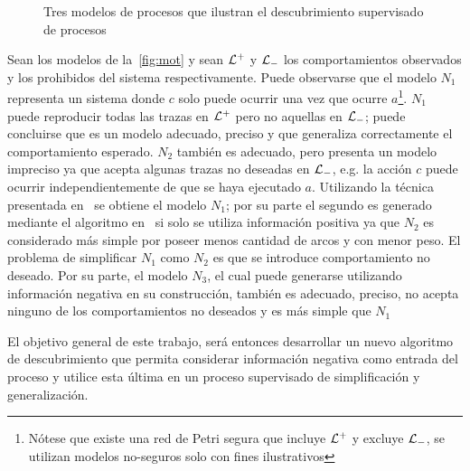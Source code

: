 \begin{example}
    \begin{figure}[H]
        \centering
        \hspace{10mm}
        \hspace{10mm}
        \hspace{10mm}
        \subbottom[\label{sfig:mot.4}]{\scalebox{.9}{}}
        \caption{Tres modelos de procesos que ilustran el descubrimiento supervisado de procesos}
        \label{fig:mot}
    \end{figure}

    Sean los modelos de la~\autoref{fig:mot} y sean ${\mathcal L}^+$ y ${\mathcal L}_-$ los 
    comportamientos observados y los prohibidos del sistema respectivamente.
    Puede observarse que el modelo $N_1$ representa un sistema donde $c$ solo puede ocurrir una vez
    que ocurre $a$\footnote{Nótese que existe una red de Petri segura que incluye ${\mathcal L}^+$ y 
    excluye ${\mathcal L}_-$, se utilizan modelos no-seguros solo con fines ilustrativos}.
    $N_1$ puede reproducir todas las trazas en ${\mathcal L}^+$ pero no aquellas en ${\mathcal L}_-$; puede
    concluirse que es un modelo adecuado, preciso y que generaliza correctamente el comportamiento
    esperado. $N_2$ también es adecuado, pero presenta un modelo impreciso ya que acepta 
    algunas trazas no deseadas en ${\mathcal L}_-$, e.g. la acción $c$ puede ocurrir independientemente de que 
    se haya ejecutado $a$. Utilizando la técnica presentada en~\cite{CarmonaC14} se obtiene el 
    modelo $N_1$; por su parte  el segundo es generado mediante el algoritmo en~\cite{LeonCB15} si solo
    se utiliza información positiva ya que $N_2$ es considerado más simple por poseer menos 
    cantidad de arcos y con menor peso. El problema de simplificar $N_1$ como $N_2$ es que se introduce
    comportamiento no deseado.
    Por su parte, el modelo $N_3$, el cual puede generarse utilizando información negativa en su construcción,
    también es adecuado, preciso, no acepta ninguno de los comportamientos no deseados y es más simple que $N_1$
\end{example}

El objetivo general de este trabajo, será entonces desarrollar un nuevo algoritmo de descubrimiento que permita considerar
información negativa como entrada del proceso y utilice esta última en un proceso supervisado de simplificación y 
generalización. 

